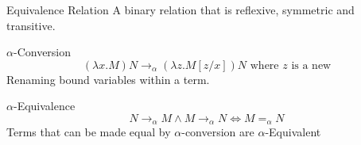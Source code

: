 \begin{definitionbox}{Equivalence Relation}
    A binary relation that is reflexive, symmetric and transitive.
\end{definitionbox}
\begin{tcbraster}[raster columns=2, raster equal height]
    \begin{definitionbox}{$\alpha$-Conversion}
        \[(\lambda x . M) N \to_\alpha (\lambda z. M[z/x]) N \text{ where }z \text{ is a new} \]
        Renaming bound variables within a term.
    \end{definitionbox}
    \begin{definitionbox}{$\alpha$-Equivalence}
        \[N \to_\alpha M \land M \to_\alpha N \Leftrightarrow M =_\alpha N\]
        Terms that can be made equal by $\alpha$-conversion are $\alpha$-Equivalent
    \end{definitionbox}
\end{tcbraster}
